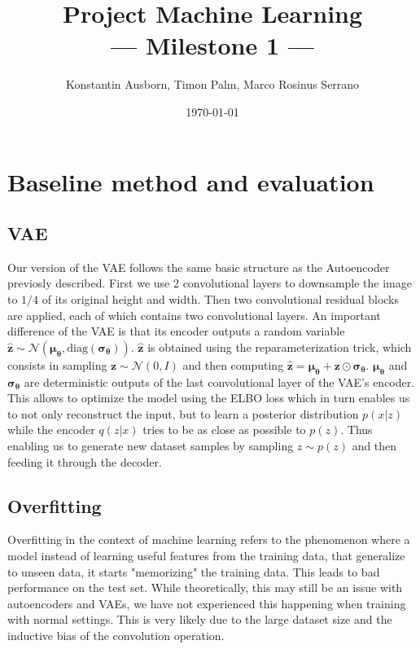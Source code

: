 \documentclass[10pt,a4paper,twoside]{article}
\title{Project Machine Learning\\--- Milestone 1 ---}
\author{Konstantin Ausborn, Timon Palm, Marco Rosinus Serrano}
\date{\today}
\begin{document}
    \maketitle

    \section{Baseline method and evaluation}\label{sec:baseline-method-and-evaluation}
    

\subsection{VAE}

Our version of the VAE follows the same basic structure as the Autoencoder
previosly described. First we use 2 convolutional layers to downsample the
image to $1/4$ of its original height and width. Then two convolutional
residual blocks are applied, each of which contains two convolutional layers.
An important difference of the VAE is that its encoder outputs a random
variable $\boldsymbol{\hat{z}} \sim \mathcal{N}(\boldsymbol{\mu_\theta}, \text{diag}
(\boldsymbol{\sigma_\theta}))$. $\boldsymbol{\hat{z}}$ is obtained using the
reparameterization trick, which consists in sampling $\boldsymbol{z}
\sim \mathcal{N}(0, I)$ and then computing $\boldsymbol{\hat{z}} =
\boldsymbol{\mu_\theta} + \boldsymbol{z} \odot \boldsymbol{\sigma_\theta}$.
$\boldsymbol{\mu_\theta}$ and $\boldsymbol{\sigma_\theta}$ are deterministic
outputs of the last convolutional layer of the VAE's encoder. This allows to
optimize the model using the ELBO loss which in turn enables us to not only
reconstruct the input, but to learn a posterior distribution $p(x|z)$ while
the encoder $q(z|x)$ tries to be as close as possible to $p(z)$. Thus enabling
us to generate new dataset samples by sampling $z \sim p(z)$ and then feeding
it through the decoder.

\subsection{Overfitting}

Overfitting in the context of machine learning refers to the phenomenon where
a model instead of learning useful features from the training data, that
generalize to unseen data, it starts "memorizing" the training data. This
leads to bad performance on the test set. While theoretically, this may still
be an issue with autoencoders and VAEs, we have not experienced this happening
when training with normal settings. This is very likely due to the large
dataset size and the inductive bias of the convolution operation.
\end{document}
